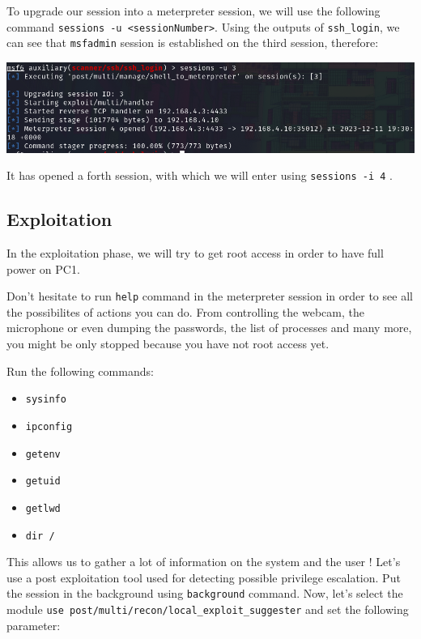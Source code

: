 \documentclass[a4paper,11pt,singlespacing]{article}
\providecommand{\tightlist}{%
  \setlength{\itemsep}{0pt}\setlength{\parskip}{0pt}}
\begin{document}
To upgrade our session into a meterpreter session, we will use the
following command
\texttt{sessions\ -u\ \textless{}sessionNumber\textgreater{}}. Using the
outputs of \texttt{ssh\_login}, we can see that \texttt{msfadmin}
session is established on the third session, therefore:

\includegraphics{./Images/Image04.png}

It has opened a forth session, with which we will enter using
\texttt{sessions\ -i\ 4} .

\subsection{Exploitation}\label{exploitation}

In the exploitation phase, we will try to get root access in order to
have full power on PC1.

Don't hesitate to run \texttt{help} command in the meterpreter session
in order to see all the possibilites of actions you can do. From
controlling the webcam, the microphone or even dumping the passwords,
the list of processes and many more, you might be only stopped because
you have not root access yet.

Run the following commands:

\begin{itemize}
\tightlist
\item
  \texttt{sysinfo}
\item
  \texttt{ipconfig}
\item
  \texttt{getenv}
\item
  \texttt{getuid}
\item
  \texttt{getlwd}
\item
  \texttt{dir\ /}
\end{itemize}

This allows us to gather a lot of information on the system and the user
! Let's use a post exploitation tool used for detecting possible
privilege escalation. Put the session in the background using
\texttt{background} command. Now, let's select the module
\texttt{use\ post/multi/recon/local\_exploit\_suggester} and set the
following parameter:
\end{document}
